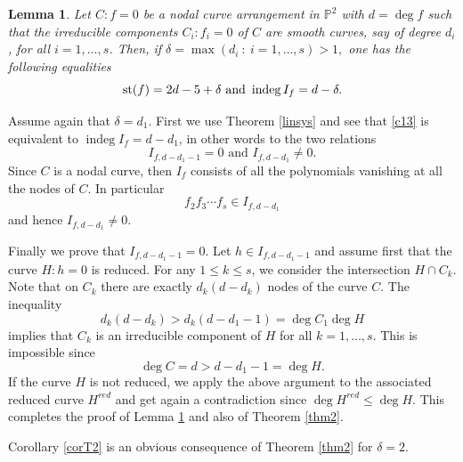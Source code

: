 \documentclass[12pt]{amsart}
\theoremstyle{plain}
\newtheorem{lem}[subsection]{Lemma}
\theoremstyle{definition}
\numberwithin{equation}{section}
\newcommand{\de}{{\delta}}
\newcommand{\PP}{\mathbb{P}}
\DeclareMathOperator{\indeg}{indeg}
\begin{document}
\begin{lem}
\label{lem3}
Let $C:f=0$ be a nodal curve arrangement in $\PP^2$ with $d=\deg f$ such that 
 the irreducible components $C_i:f_i=0$ of $C$ are smooth curves, say of degree $d_i$, for all $i=1, \ldots,s$. Then,
if
 $\de=\max (d_i \ : \ i=1,\ldots ,s)>1,$
one  has the following equalities
$${\rm st}(f)=2d-5+\de \text{  and  } \indeg I_f=d-\de.$$
\end{lem}
\proof
Assume again that $\de=d_1$.
First  we use Theorem \ref{linsys} and see that  \eqref{c13} is equivalent to
$\indeg I_f=d-d_1$, in other words to the two relations
$$I_{f,d-d_1-1}=0 \text{  and  } I_{f,d-d_1} \ne 0.$$
Since $C$ is a nodal curve, then $I_f$ consists of all the polynomials vanishing at all the nodes of $C$. In particular
$$f_2 f_3 \cdots f_s \in I_{f,d-d_1}$$
and hence $I_{f,d-d_1}\ne 0$.

Finally we prove that $I_{f,d-d_1-1}=0$. Let $h \in I_{f,d-d_1-1}$
and assume first that the curve $H:h=0$ is reduced. For any
$1 \leq k \leq s$, we consider the intersection $H \cap C_k$.
Note that on $C_k$ there are exactly $d_k(d-d_k)$ nodes of the curve $C$. The inequality
$$ d_k(d-d_k) >d_k(d-d_1-1)=\deg C_1 \deg H$$
implies that $C_k$ is an irreducible component of $H$ for all
$k=1, \ldots,s$. This is impossible since 
$$\deg C=d >d-d_1-1=\deg H.$$
If the curve $H$ is not reduced, we apply the above argument to the associated reduced curve $H^{red}$ and get again a contradiction since $\deg H^{red}\leq \deg H$.
This completes the proof of Lemma \ref{lem3} and also of Theorem  \ref{thm2}.  
\endproof


Corollary   \ref{corT2} is an obvious consequence of Theorem  \ref{thm2} for $\de=2$.
\end{document}
